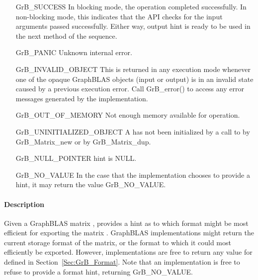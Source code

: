 \begin{itemize}[leftmargin=2.3in]
    \item[{\sf GrB\_SUCCESS}]         In blocking mode, the operation completed
    successfully. In non-blocking mode, this indicates that the API checks 
    for the input arguments passed successfully. Either way, output
    {\sf hint} is ready to be used in the next method of the sequence.

    \item[{\sf GrB\_PANIC}]           Unknown internal error.
    
    \item[{\sf GrB\_INVALID\_OBJECT}] This is returned in any execution mode 
    whenever one of the opaque GraphBLAS objects (input or output) is in an invalid 
    state caused by a previous execution error.  Call {\sf GrB\_error()} to access 
    any error messages generated by the implementation.

    \item[{\sf GrB\_OUT\_OF\_MEMORY}] Not enough memory available for operation.
    
    \item[{\sf GrB\_UNINITIALIZED\_OBJECT}]  {\sf A} has not been 
    initialized by a call to {\sf by GrB\_Matrix\_new} or 
    {\sf by GrB\_Matrix\_dup}.
    
    \item[{\sf GrB\_NULL\_POINTER}]  {\sf hint} is {\sf NULL}.

    \item[{\sf GrB\_NO\_VALUE}]  In the case that the implementation chooses to
    provide a hint, it may return the value {\sf GrB\_NO\_VALUE}.
\end{itemize}

\paragraph{Description}

Given a GraphBLAS matrix , provides a hint as to which format might be most
efficient for exporting the matrix .  GraphBLAS implementations might
return the current storage format of the matrix, or the format to which it could
most efficiently be exported.  However, implementations are free to return any
value for  defined in Section~\ref{Sec:GrB_Format}.  Note that an
implementation is free to refuse to provide a format hint, returning
{\sf GrB\_NO\_VALUE}.


